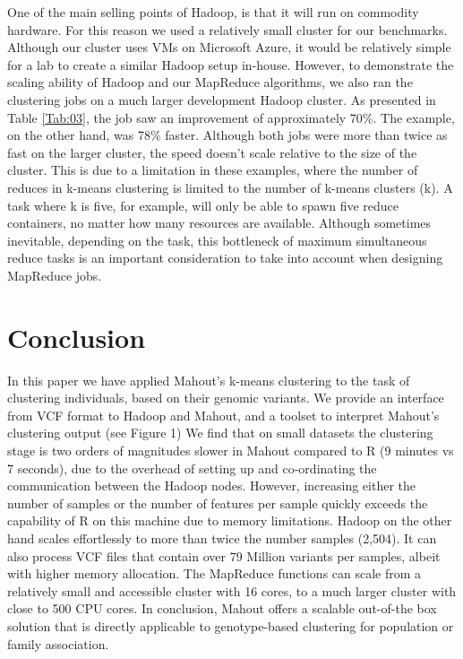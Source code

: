 \documentclass{bioinfo}
\begin{document}
One of the main selling points of Hadoop, is that it will run on commodity hardware. For this reason we used a relatively small cluster for our benchmarks. Although our cluster uses VMs on Microsoft Azure, it would be relatively simple for a lab to
create a similar Hadoop setup in-house. However, to demonstrate the scaling ability of Hadoop and our MapReduce algorithms, we also ran the clustering jobs on a much larger development Hadoop cluster. As presented in Table \ref{Tab:03}, the \OnePhaseone{} job saw an improvement of approximately 70\%.
The \FullPhasethree{} example, on the other hand, was 78\% faster.
Although both jobs were more than twice as fast on the larger cluster, the speed doesn't scale relative to the size of the cluster. This is due to a limitation in these examples, where the number of reduces in k-means clustering is limited to the number of k-means clusters (k).
A task where k is five, for example, will only be able to spawn five reduce containers, no matter how many resources are available. Although sometimes inevitable, depending on the task, this bottleneck of maximum simultaneous reduce tasks is an important consideration to take into account when designing MapReduce jobs. 







\section*{Conclusion}
In this paper we have applied Mahout's k-means clustering to the task of clustering individuals, based on their genomic variants. 
We provide an interface from VCF format to Hadoop and Mahout, and a toolset to interpret Mahout's clustering output (see Figure 1)
We find that on small datasets the clustering stage is two orders of magnitudes slower in Mahout compared to R (9 minutes vs 7 seconds), due to the overhead of setting up and co-ordinating the communication between the Hadoop nodes. 
However, increasing either the number of samples or the number of features per sample quickly exceeds the capability of R on this machine due to memory limitations.
Hadoop on the other hand scales effortlessly to more than twice the number samples (2,504). It can also process VCF files that contain over 79 Million variants per samples, albeit with higher memory allocation.
The MapReduce functions can scale from a relatively small and accessible cluster with 16 cores, to a much larger cluster with close to 500 CPU cores. 
In conclusion, Mahout offers a scalable out-of-the box solution that is directly applicable to genotype-based clustering for population or family association. 
\end{document}
